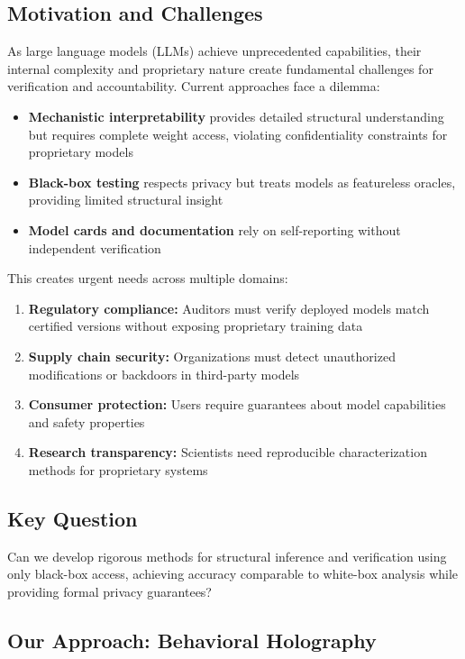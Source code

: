 \documentclass[11pt,a4paper]{article}
\begin{document}
\subsection{Motivation and Challenges}

As large language models (LLMs) achieve unprecedented capabilities, their internal complexity and proprietary nature create fundamental challenges for verification and accountability. Current approaches face a dilemma:

\begin{itemize}
\item \textbf{Mechanistic interpretability} \citep{olah2020zoom} provides detailed structural understanding but requires complete weight access, violating confidentiality constraints for proprietary models
\item \textbf{Black-box testing} respects privacy but treats models as featureless oracles, providing limited structural insight
\item \textbf{Model cards and documentation} \citep{mitchell2019model} rely on self-reporting without independent verification
\end{itemize}

This creates urgent needs across multiple domains:

\begin{enumerate}
\item \textbf{Regulatory compliance:} Auditors must verify deployed models match certified versions without exposing proprietary training data
\item \textbf{Supply chain security:} Organizations must detect unauthorized modifications or backdoors in third-party models
\item \textbf{Consumer protection:} Users require guarantees about model capabilities and safety properties
\item \textbf{Research transparency:} Scientists need reproducible characterization methods for proprietary systems
\end{enumerate}

\subsection{Key Question}

Can we develop rigorous methods for structural inference and verification using only black-box access, achieving accuracy comparable to white-box analysis while providing formal privacy guarantees?

\subsection{Our Approach: Behavioral Holography}
\end{document}
